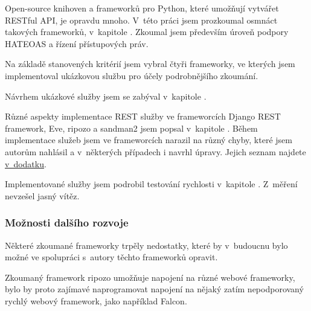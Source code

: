 Open-source knihoven a frameworků pro Python, které umožňují vytvářet RESTful API, je opravdu mnoho. V~této práci jsem prozkoumal osmnáct takových frameworků, v~kapitole \emph{}. Zkoumal jsem především úroveň podpory HATEOAS a řízení přístupových práv.

Na základě stanovených kritérií jsem vybral čtyři frameworky, ve kterých jsem implementoval ukázkovou službu pro účely podrobnějšího zkoumání.

Návrhem ukázkové služby jsem se zabýval v~kapitole \emph{}.

Různé aspekty implementace REST služby ve frameworcích Django REST framework, Eve, ripozo a sandman2 jsem popsal v~kapitole \emph{}. Během implementace služeb jsem ve frameworcích narazil na různý chyby, které jsem autorům nahlásil a v~některých případech i navrhl úpravy. Jejich seznam najdete \protect\hyperlink{issues}{v~dodatku}.

Implementované služby jsem podrobil testování rychlosti v~kapitole \emph{}. Z~měření nevzešel jasný vítěz.

\subsubsection*{Možnosti dalšího rozvoje}\label{moux17enosti-dalux161uxedho-rozvoje}

Některé zkoumané frameworky trpěly nedostatky, které by v~budoucnu bylo možné ve spolupráci s~autory těchto frameworků opravit.

Zkoumaný framework ripozo umožňuje napojení na různé webové frameworky, bylo by proto zajímavé naprogramovat napojení na nějaký zatím nepodporovaný rychlý webový framework, jako například Falcon.
